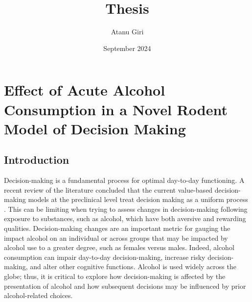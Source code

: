 \documentclass{article}
\title{Thesis}
\author{Atanu Giri}
\date{September 2024}
\begin{document}
\maketitle

\section{Effect of Acute Alcohol Consumption in a Novel Rodent Model of Decision Making}
\subsection{Introduction}
Decision-making is a fundamental process for optimal day-to-day functioning. A recent review of the literature concluded that the current value-based decision-making models at the preclinical level treat decision making as a uniform process \cite{orsini2019deconstructing}. This can be limiting when trying to assess changes in decision-making following exposure to substances, such as alcohol, which have both aversive and rewarding qualities. Decision-making changes are an important metric for gauging the impact alcohol on an individual or across groups that may be impacted by alcohol use to a greater degree, such as females versus males\cite{flores2020sex}. Indeed, alcohol consumption can impair day-to-day decision-making\cite{bechara2005decision}, increase risky decision-making\cite{fein2004impairment, lane2004alcohol, george2005acute, noel2007response, bidwell2013biphasic, kornreich2013polysubstance, brevers2014impaired, hwa2011persistent, aguirre2020sex, burnette2021diminished}, and alter other cognitive functions\cite{weissenborn2003acute, field2010acute, dry2012dose, van2019acute}. Alcohol is used widely across the globe\cite{degenhardt2008toward, rehm2016should}; thus, it is critical to explore how decision-making is affected by the presentation of alcohol and how subsequent decisions may be influenced by prior alcohol-related choices.

\vspace{1em}
\end{document}
